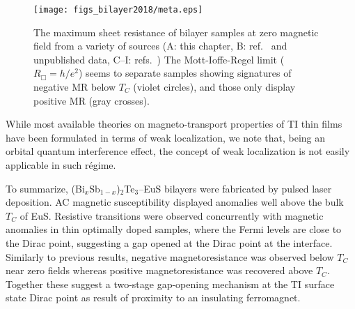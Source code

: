 %
\begin{figure}[ht]%
    \centering
    \texttt{[image: figs\_bilayer2018/meta.eps]}
    \caption[Sheet resistance and signatures of negative magnetoresistance in TI-ferromagnet bilayer samples from literature]{\label{fig:bilayer2018_wl_trend} The maximum sheet resistance of bilayer samples at zero magnetic field from a variety of sources (A: this chapter, B: ref.~\protect\cite{bilayer2014} and unpublished data, C--I: refs.~\protect\cite{Samarth2017, Shi2014, Petta2014, Wang2014, Tian2016, Qiu2017}) The Mott-Ioffe-Regel limit ($R_\Box = h/e^2$) seems to separate samples showing signatures of negative MR below $T_C$ (violet circles), and those only display positive MR (gray crosses).}
\end{figure}%
While most available theories on magneto-transport properties of TI thin films have been formulated in terms of weak localization, we note that, being an orbital quantum interference effect, the concept of weak localization is not easily applicable in such r\'egime.

To summarize, (Bi$_x$Sb$_{1-x}$)$_2$Te$_3$--EuS bilayers were fabricated by pulsed laser deposition. AC magnetic susceptibility displayed anomalies well above the bulk $T_C$ of EuS. Resistive transitions were observed concurrently with magnetic anomalies in thin optimally doped samples, where the Fermi levels are close to the Dirac point, suggesting a gap opened at the Dirac point at the interface. Similarly to previous results, negative magnetoresistance was observed below $T_C$ near zero fields whereas positive magnetoresistance was recovered above $T_C$. Together these suggest a two-stage gap-opening mechanism at the TI surface state Dirac point as result of proximity to an insulating ferromagnet.